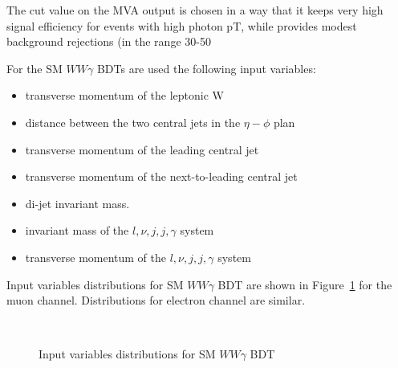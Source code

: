  The cut value on the MVA output is chosen in a way that it keeps very high signal efficiency for events with high photon pT, while provides modest background 
rejections (in the range 30-50%

 
For the SM $WW\gamma$ BDTs are used the following input variables:
\begin{itemize}
\item transverse momentum of the leptonic W
\item distance between the two central jets in the $\eta-\phi$ plan
\item transverse momentum of the leading central jet
\item transverse momentum of the next-to-leading central jet
\item di-jet invariant mass.
\item invariant mass of the $l,\nu,j,j,\gamma$ system
\item transverse momentum of the $l,\nu,j,j,\gamma$ system
\end{itemize}

Input variables distributions for SM $WW\gamma$ BDT are shown in Figure~\ref{fig:InSMmu} for the muon channel. Distributions for electron channel are similar.

\begin{figure}[]
  \begin{center}
    \\
    \caption{ Input variables distributions for SM $WW\gamma$ BDT }
    \label{fig:InSMmu}
  \end{center}
\end{figure}

